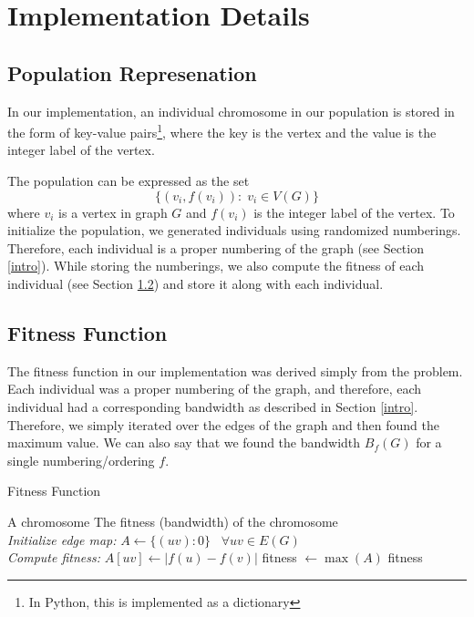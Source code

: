 \documentclass[conference,compsoc]{IEEEtran}
\begin{document}
\section{Implementation Details}
\subsection{Population Represenation}
In our implementation, an individual chromosome in our population 
is stored in the form of key-value pairs\footnote{In Python, this is implemented 
as a dictionary}, where the key is the vertex and the value is the integer label 
of the vertex. 
\setlength{\parskip}{0.4 em}

The population can be expressed as the set \[\{(v_i, f(v_i)): \; v_i \in V(G)\}\]
where $v_i$ is a vertex in graph $G$ and $f(v_i)$ is the integer label of the 
vertex. To initialize the population, we generated individuals using randomized numberings. 
Therefore, each individual is a proper numbering of the graph (see Section \ref{intro}). While storing the numberings, 
we also compute the fitness of each individual (see Section \ref{fit}) and store it along with 
each individual. 

\setlength{\parskip}{0 em}
\subsection{Fitness Function} \label{fit}
The fitness function in our implementation was derived simply from the problem. Each individual was a proper numbering 
of the graph, and therefore, each individual had a corresponding bandwidth as described in Section \ref{intro}. Therefore, 
we simply iterated over the edges of the graph and then found the maximum value. We can also say that we found 
the bandwidth $B_f(G)$ for a single numbering/ordering $f$. 

\begin{algorithm}
\caption{Fitness Function}
\begin{algorithmic}[1]
  \renewcommand{\algorithmicrequire}{\textbf{Input:}}
  \renewcommand{\algorithmicensure}{\textbf{Output:}}
  \REQUIRE A chromosome
  \ENSURE  The fitness (bandwidth) of the chromosome
  \\ \textit{Initialize edge map: }
  \STATE $A \leftarrow \{(uv): 0\} \; \; \; \forall uv \in E(G)$
  \\ \textit{Compute fitness: }
  \STATE $A[uv] \leftarrow \lvert f(u) - f(v) \rvert$
  \ENDFOR
  \STATE fitness $\leftarrow \max(A)$
  \RETURN fitness 
\end{algorithmic}
\end{algorithm}
\end{document}
